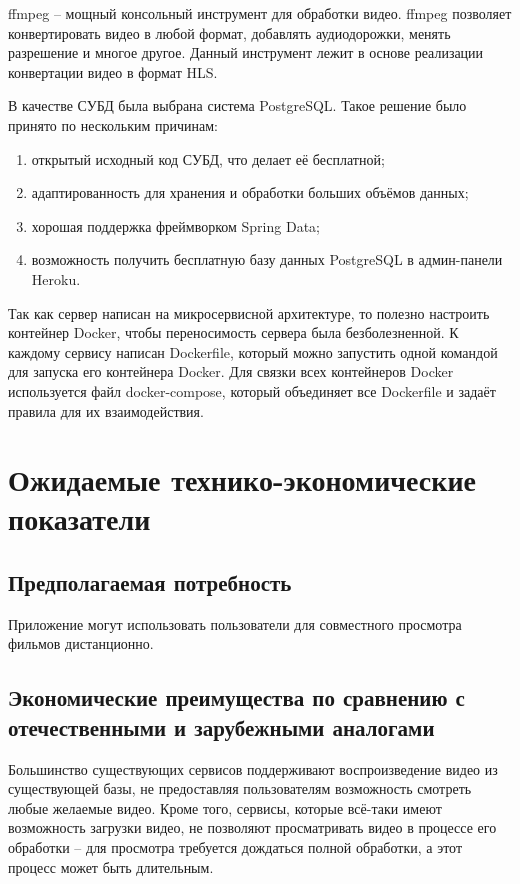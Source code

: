 \documentclass{../includes/TechDoc}
\begin{document}
    ffmpeg -- мощный консольный инструмент для обработки видео.
    ffmpeg позволяет конвертировать видео в любой формат, добавлять аудиодорожки, менять разрешение и многое другое.
    Данный инструмент лежит в основе реализации конвертации видео в формат HLS.

    В качестве СУБД была выбрана система PostgreSQL\@.
    Такое решение было принято по нескольким причинам:
    \begin{enumerate}
        \item открытый исходный код СУБД, что делает её бесплатной;
        \item адаптированность для хранения и обработки больших объёмов данных;
        \item хорошая поддержка фреймворком Spring Data;
        \item возможность получить бесплатную базу данных PostgreSQL в админ-панели Heroku.
    \end{enumerate}

    Так как сервер написан на микросервисной архитектуре, то полезно настроить контейнер Docker, чтобы переносимость сервера была безболезненной.
    К каждому сервису написан Dockerfile, который можно запустить одной командой для запуска его контейнера Docker.
    Для связки всех контейнеров Docker используется файл docker-compose, который объединяет все Dockerfile и задаёт правила для их взаимодействия.


    \section{Ожидаемые технико-экономические показатели}

    \subsection{Предполагаемая потребность}

    Приложение могут использовать пользователи для совместного просмотра фильмов дистанционно.

    \subsection{Экономические преимущества по сравнению с отечественными и зарубежными аналогами}

    Большинство существующих сервисов поддерживают воспроизведение видео из существующей базы, не предоставляя пользователям возможность смотреть любые желаемые видео.
    Кроме того, сервисы, которые всё-таки имеют возможность загрузки видео, не позволяют просматривать видео в процессе его обработки -- для просмотра требуется дождаться полной обработки, а этот процесс может быть длительным.
\end{document}
